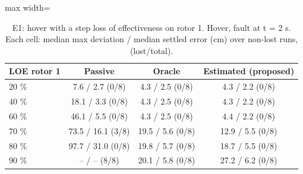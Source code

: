 \begin{table}[t]
\centering
\caption{E1: hover with a step loss of effectiveness on rotor 1. Hover, fault at t = 2 s. Each cell: median max deviation / median settled error (cm) over non-lost runs, (lost/total).}
\label{tab:e1}
\footnotesize
\setlength{\tabcolsep}{3pt}
\begin{adjustbox}{max width=\linewidth}
\begin{tabular}{lccc}
\toprule
LOE rotor 1 & Passive & Oracle & Estimated (proposed) \\
\midrule
20 \% & 7.6 / 2.7 (0/8) & 4.3 / 2.5 (0/8) & 4.3 / 2.2 (0/8) \\
40 \% & 18.1 / 3.3 (0/8) & 4.3 / 2.5 (0/8) & 4.3 / 2.2 (0/8) \\
60 \% & 46.1 / 5.5 (0/8) & 4.3 / 2.5 (0/8) & 4.4 / 2.2 (0/8) \\
70 \% & 73.5 / 16.1 (3/8) & 19.5 / 5.6 (0/8) & 12.9 / 5.5 (0/8) \\
80 \% & 97.7 / 31.0 (0/8) & 19.8 / 5.7 (0/8) & 18.7 / 5.5 (0/8) \\
90 \% & -- / -- (8/8) & 20.1 / 5.8 (0/8) & 27.2 / 6.2 (0/8) \\
\bottomrule
\end{tabular}
\end{adjustbox}
\end{table}
